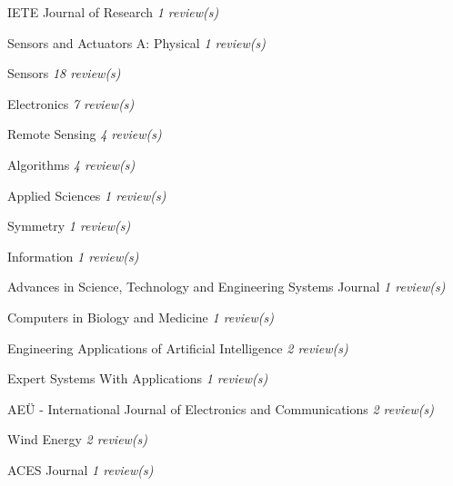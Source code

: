 {\begin{cvitems}
    \item {IETE Journal of Research \hfill \bodyfontlight\slshape\color{awesome} 1 review(s)}
    \item {Sensors and Actuators A: Physical \hfill \bodyfontlight\slshape\color{awesome} 1 review(s)}
    \item {Sensors \hfill \bodyfontlight\slshape\color{awesome} 18 review(s)}
    \item {Electronics \hfill \bodyfontlight\slshape\color{awesome} 7 review(s)}
    \item {Remote Sensing \hfill \bodyfontlight\slshape\color{awesome} 4 review(s)}
    \item {Algorithms \hfill \bodyfontlight\slshape\color{awesome} 4 review(s)}
    \item {Applied Sciences \hfill \bodyfontlight\slshape\color{awesome} 1 review(s)}
    \item {Symmetry \hfill \bodyfontlight\slshape\color{awesome} 1 review(s)}
    \item {Information \hfill \bodyfontlight\slshape\color{awesome} 1 review(s)}
    \item {Advances in Science, Technology and Engineering Systems Journal \hfill \bodyfontlight\slshape\color{awesome} 1 review(s)}
    \item {Computers in Biology and Medicine \hfill \bodyfontlight\slshape\color{awesome} 1 review(s)}
    \item {Engineering Applications of Artificial Intelligence \hfill \bodyfontlight\slshape\color{awesome} 2 review(s)}
    \item {Expert Systems With Applications \hfill \bodyfontlight\slshape\color{awesome} 1 review(s)}
    \item {AEÜ - International Journal of Electronics and Communications \hfill \bodyfontlight\slshape\color{awesome} 2 review(s)}
    \item {Wind Energy \hfill \bodyfontlight\slshape\color{awesome} 2 review(s)}
    \item {ACES Journal \hfill \bodyfontlight\slshape\color{awesome} 1 review(s)}
    
    \vspace{4.0mm}
\end{cvitems}
}


